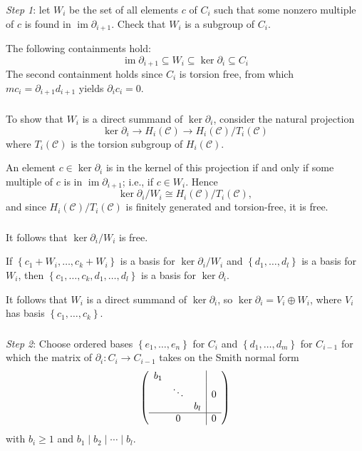 \documentclass{beamer}
\newcommand{\cbr}[1]{\left\{#1\right\}}
\DeclareMathOperator{\im}{im}
\begin{document}
\begin{frame}
  \frametitle{}

  \textit{Step 1}: let $W_i$ be the set of all elements $c$ of $C_i$ such that some nonzero multiple of $c$ is found in $\im \partial_{i+1}$. Check that $W_i$ is a subgroup of $C_i$.

  The following containments hold:
  \[\im \partial_{i+1}\subseteq W_i\subseteq \ker\partial_i \subseteq C_i\] The second containment holds since $C_i$ is torsion free, from which $mc_i = \partial_{i+1}d_{i+1}$ yields $\partial_i c_i = 0$.

\end{frame}

\begin{frame}
  \frametitle{}

  To show that $W_i$ is a direct summand of $\ker \partial_i$, consider the natural projection \[\ker\partial_i \to H_i(\mathcal{C})\to H_i(\mathcal{C})/T_i(\mathcal{C})\] where $T_i(\mathcal{C})$ is the torsion subgroup of $H_i(\mathcal{C})$.

  An element $c\in \ker\partial_i$ is in the kernel of this projection if and only if some multiple of $c$ is in $\im\partial_{i+1}$; i.e., if $c\in W_i$. Hence \[\ker\partial_i/W_i \cong H_i(\mathcal{C})/T_i(\mathcal{C}),\] and since $H_i(\mathcal{C})/T_i(\mathcal{C})$ is finitely generated and torsion-free, it is free.

\end{frame}

\begin{frame}
  \frametitle{}

  It follows that $\ker\partial_i /W_i$ is free.
  
  If $\cbr{c_1 + W_i,\dots,c_k + W_i}$ is a basis for $\ker\partial_i /W_i$ and $\cbr{d_1,\dots,d_l}$ is a basis for $W_i$, then $\cbr{c_1,\dots,c_k,d_1,\dots,d_l}$ is a basis for $\ker\partial_i$.
  
  It follows that $W_i$ is a direct summand of $\ker\partial_i$, so $\ker\partial_i = V_i \oplus W_i$, where $V_i$ has basis $\cbr{c_1,\dots,c_k}$.

\end{frame}

\begin{frame}
  \frametitle{}

  \textit{Step 2}: Choose ordered bases $\cbr{e_1,\dots,e_n}$ for $C_i$ and $\cbr{d_1,\dots,d_m}$ for $C_{i-1}$ for which the matrix of $\partial_i\colon C_i\to C_{i-1}$ takes on the Smith normal form \[\left(\begin{array}[]{ccc|c}
    b_1 &  &  &   \\
    & \ddots & &0  \\
    & & b_l &  \\
    \hline 
    & 0& & 0 
  \end{array}\right)\] with $b_i\geq 1$ and $b_1\mid b_2\mid\cdots\mid b_l$.

\end{frame}
\end{document}
